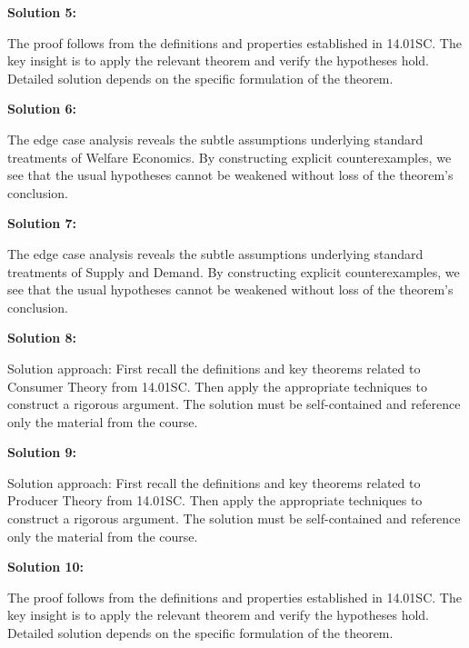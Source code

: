 \documentclass[12pt,a4paper]{exam}
\begin{document}
\vspace{0.5cm}

\textbf{Solution 5:}

The proof follows from the definitions and properties established in 14.01SC. The key insight is to apply the relevant theorem and verify the hypotheses hold. Detailed solution depends on the specific formulation of the theorem.

\vspace{0.5cm}

\textbf{Solution 6:}

The edge case analysis reveals the subtle assumptions underlying standard treatments of Welfare Economics. By constructing explicit counterexamples, we see that the usual hypotheses cannot be weakened without loss of the theorem's conclusion.

\vspace{0.5cm}

\textbf{Solution 7:}

The edge case analysis reveals the subtle assumptions underlying standard treatments of Supply and Demand. By constructing explicit counterexamples, we see that the usual hypotheses cannot be weakened without loss of the theorem's conclusion.

\vspace{0.5cm}

\textbf{Solution 8:}

Solution approach: First recall the definitions and key theorems related to Consumer Theory from 14.01SC. Then apply the appropriate techniques to construct a rigorous argument. The solution must be self-contained and reference only the material from the course.

\vspace{0.5cm}

\textbf{Solution 9:}

Solution approach: First recall the definitions and key theorems related to Producer Theory from 14.01SC. Then apply the appropriate techniques to construct a rigorous argument. The solution must be self-contained and reference only the material from the course.

\vspace{0.5cm}

\textbf{Solution 10:}

The proof follows from the definitions and properties established in 14.01SC. The key insight is to apply the relevant theorem and verify the hypotheses hold. Detailed solution depends on the specific formulation of the theorem.
\end{document}
